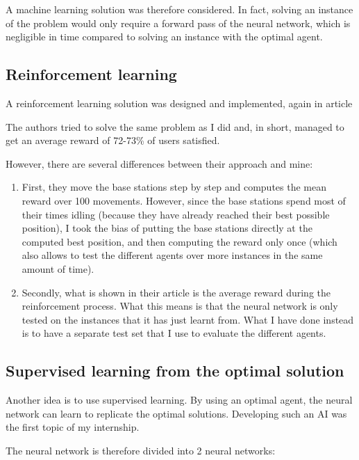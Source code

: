 \documentclass[letterpaper]{article}
\begin{document}
A machine learning solution was therefore considered.
In fact, solving an instance of the problem would only require a forward pass of the neural network, which is negligible in time compared to solving an instance with the optimal agent.

\subsection{Reinforcement learning}
\label{reinforcement}

A reinforcement learning solution was designed and implemented, again in article\;\cite{main_article}

The authors tried to solve the same problem as I did and, in short, managed to get an average reward of 72-73\% of users satisfied.

However, there are several differences between their approach and mine:

\begin{enumerate}
    \item First, they move the base stations step by step and computes the mean reward over 100 movements.
          However, since the base stations spend most of their times idling (because they have already reached their best possible position),
          I took the bias of putting the base stations directly at the computed best position, and then computing the reward only once (which also allows to test the different agents over more instances in the same amount of time).
    \item Secondly, what is shown in their article is the average reward during the reinforcement process.
        What this means is that the neural network is only tested on the instances that it has just learnt from.
        What I have done instead is to have a separate test set that I use to evaluate the different agents.
\end{enumerate}

\subsection{Supervised learning from the optimal solution}

Another idea is to use supervised learning.
By using an optimal agent, the neural network can learn to replicate the optimal solutions.
Developing such an AI was the first topic of my internship.

The neural network is therefore divided into 2 neural networks:
\end{document}
